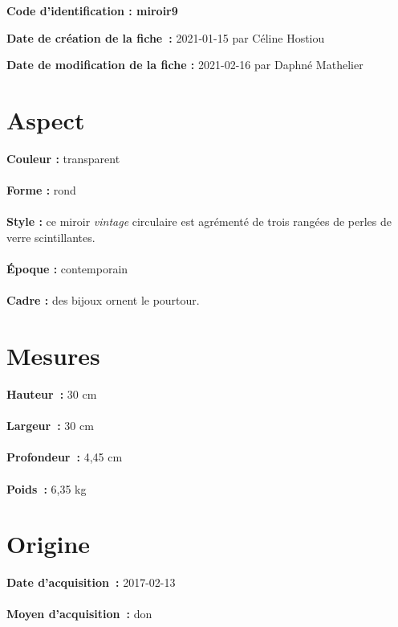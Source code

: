
     {\bf \huge Code d’identification : miroir9} \\
    \newline \hr \begin{center} 
       
    \end{center} 
    \begin{itemize}
    
    \footnotesize {\item {\bf Date de création de la fiche :} 2021-01-15
    {par Céline Hostiou}} 
    \footnotesize {\item {\bf Date de modification de la fiche :} 2021-02-16
    {par Daphné Mathelier} \\}
    \end{itemize}
   \hr 
    \section* {Aspect} 
    {\bf \large Couleur :} transparent
    \\ \\ {\bf \large Forme :} rond 
    \\ \\ {\bf \large Style :} ce miroir 
    {\em {vintage}}
   circulaire est agrémenté de trois
            rangées de perles de verre scintillantes. 
        \\ \\ {\bf \large Époque :} contemporain 
    \\ \\ {\bf \large Cadre :} des bijoux ornent le pourtour. 
    \section* {Mesures}
     {\bf \large Hauteur :} 30 cm
   \\ \\ {\bf \large Largeur :} 30 cm 
   \\ \\ {\bf \large Profondeur :} 4,45 cm  
   \\ \\ {\bf \large Poids :} 6,35 kg
  
    \section* {Origine}
    {\bf \large Date d’acquisition :} 2017-02-13 \\ \\
    {\bf \large Moyen d’acquisition :} don
